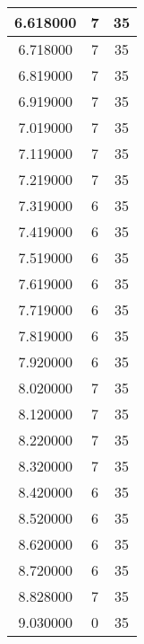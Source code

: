 \begin{longtable}[htbp]{|c|c|c|}
6.618000 & 7 & 35 \\ \hline
6.718000 & 7 & 35 \\ \hline
6.819000 & 7 & 35 \\ \hline
6.919000 & 7 & 35 \\ \hline
7.019000 & 7 & 35 \\ \hline
7.119000 & 7 & 35 \\ \hline
7.219000 & 7 & 35 \\ \hline
7.319000 & 6 & 35 \\ \hline
7.419000 & 6 & 35 \\ \hline
7.519000 & 6 & 35 \\ \hline
7.619000 & 6 & 35 \\ \hline
7.719000 & 6 & 35 \\ \hline
7.819000 & 6 & 35 \\ \hline
7.920000 & 6 & 35 \\ \hline
8.020000 & 7 & 35 \\ \hline
8.120000 & 7 & 35 \\ \hline
8.220000 & 7 & 35 \\ \hline
8.320000 & 7 & 35 \\ \hline
8.420000 & 6 & 35 \\ \hline
8.520000 & 6 & 35 \\ \hline
8.620000 & 6 & 35 \\ \hline
8.720000 & 6 & 35 \\ \hline
8.828000 & 7 & 35 \\ \hline
9.030000 & 0 & 35 \\ \hline
\end{longtable}
